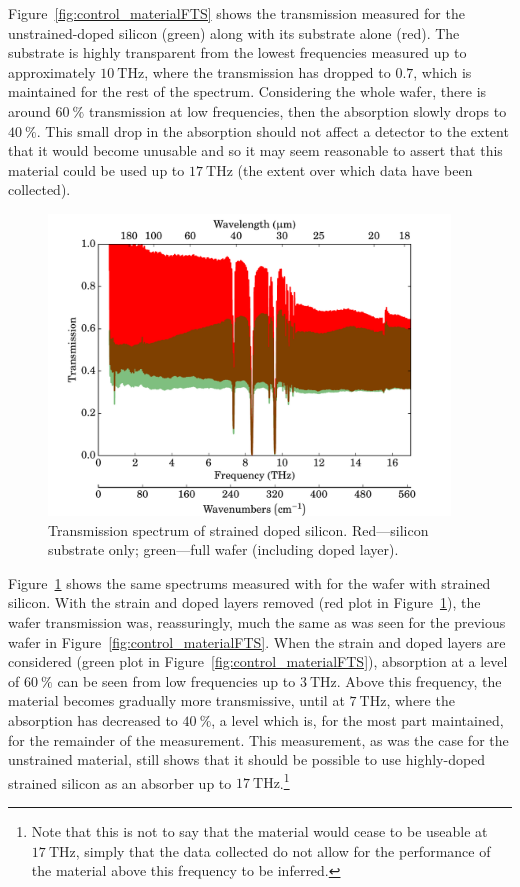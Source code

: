 Figure~\ref{fig:control_materialFTS} shows the transmission measured for the unstrained-doped silicon (green) along with its substrate alone (red). The substrate is highly transparent from the lowest frequencies measured up to approximately $10~\mathrm{THz}$, where the transmission has dropped to $0.7$, which is maintained for the rest of the spectrum. Considering the whole wafer, there is around $60~\%$ transmission at low frequencies, then the absorption  slowly drops to $40~\%$. This small drop in the absorption should not affect a detector to the extent that it would become unusable and so it may seem reasonable to assert that this material could be used up to $17~\mathrm{THz}$ (the extent over which data have been collected).
\begin{figure}[tb]
\begin{center}
\includegraphics[width = 0.95\textwidth]{figures/strained_materialFTS}
\caption[Transmission spectrum of strained doped silicon]{Transmission spectrum of strained doped silicon. Red---silicon substrate only; green---full wafer (including doped layer).}
\label{fig:strained_materialFTS}
\end{center}
\end{figure}
\par 
Figure~\ref{fig:strained_materialFTS} shows the same spectrums measured with for the wafer with strained silicon. With the strain and doped layers removed (red plot in Figure~\ref{fig:strained_materialFTS}), the wafer transmission was, reassuringly, much the same as was seen for the previous wafer in Figure~\ref{fig:control_materialFTS}. When the strain and doped layers are considered (green plot in Figure~\ref{fig:control_materialFTS}), absorption at a level of $60~\%$ can be seen from low frequencies up to $3~\mathrm{THz}$. Above this frequency, the material becomes gradually more transmissive, until at $7~\mathrm{THz}$, where the absorption has decreased to $40~\%$, a level which is, for the most part maintained, for the remainder of the measurement. This measurement, as was the case for the unstrained material, still shows that it should be possible to use highly-doped strained silicon as an absorber up to $17~\mathrm{THz}$.\footnote{Note that this is not to say that the material would cease to be useable at $17~\mathrm{THz}$, simply that the data collected do not allow for the performance of the material above this frequency to be inferred.}
